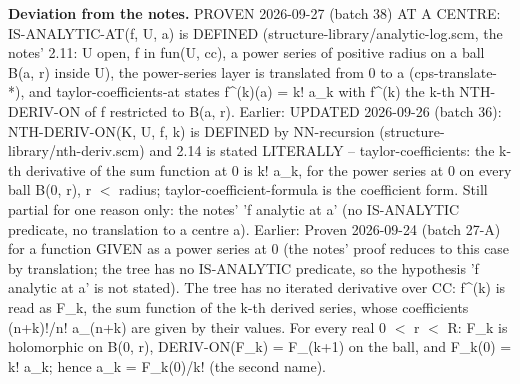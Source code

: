 %
\noindent\textbf{Deviation from the notes.} PROVEN 2026-09-27 (batch 38) AT A CENTRE: IS-ANALYTIC-AT(f, U, a) is DEFINED (structure-library/analytic-log.scm, the notes' 2.11: U open, f in fun(U, cc), a power series of positive radius on a ball B(a, r) inside U), the power-series layer is translated from 0 to a (cps-translate-*), and taylor-coefficients-at states f\textasciicircum{}(k)(a) = k! a\_k with f\textasciicircum{}(k) the k-th NTH-DERIV-ON of f restricted to B(a, r). Earlier: UPDATED 2026-09-26 (batch 36): NTH-DERIV-ON(K, U, f, k) is DEFINED by NN-recursion (structure-library/nth-deriv.scm) and 2.14 is stated LITERALLY -- taylor-coefficients: the k-th derivative of the sum function at 0 is k! a\_k, for the power series at 0 on every ball B(0, r), r $<$ radius; taylor-coefficient-formula is the coefficient form. Still partial for one reason only: the notes' 'f analytic at a' (no IS-ANALYTIC predicate, no translation to a centre a). Earlier: Proven 2026-09-24 (batch 27-A) for a function GIVEN as a power series at 0 (the notes' proof reduces to this case by translation; the tree has no IS-ANALYTIC predicate, so the hypothesis 'f analytic at a' is not stated). The tree has no iterated derivative over CC: f\textasciicircum{}(k) is read as F\_k, the sum function of the k-th derived series, whose coefficients (n+k)!/n! a\_(n+k) are given by their values. For every real 0 $<$ r $<$ R: F\_k is holomorphic on B(0, r), DERIV-ON(F\_k) = F\_(k+1) on the ball, and F\_k(0) = k! a\_k; hence a\_k = F\_k(0)/k! (the second name).
%
\renewcommand{\thethm}{2.15}
\begin{lem}\label{thm:ratio-test-converges-limsup}
%
\leavevmode
{}
%
\end{lem}
